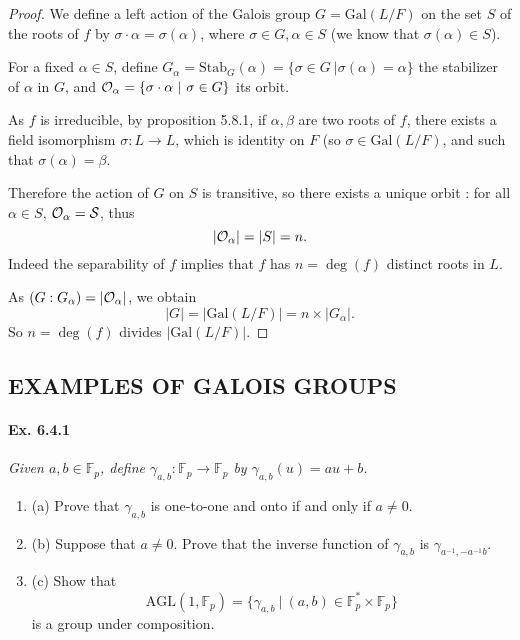 \documentclass[11pt,a4paper]{article}
\newcommand{\be} {\begin{enumerate}}
\newcommand{\ee} {\end{enumerate}}
\newcommand{\F}{\mathbb{F}}
\newcommand{\Gal}{\mathrm{Gal}}
\begin{document}
\begin{proof}

We define a left action of the Galois group $G = \Gal(L/F)$ on the set $S$ of the roots of $f$ by $\sigma \cdot \alpha = \sigma(\alpha)$, where $\sigma \in G,  \alpha \in S$ (we know that $\sigma(\alpha) \in S$).

For a fixed $\alpha \in  S$, define $G_{\alpha}= \mathrm{Stab}_G(\alpha) = \{\sigma \in G \ \vert \sigma(\alpha) = \alpha\}$ the stabilizer of $\alpha$ in $G$, and ${\cal O}_\alpha = \{\sigma \cdot \alpha \ \vert \  \sigma \in G \}$ its orbit.

As $f$ is irreducible, by proposition 5.8.1, if $\alpha,\beta$ are two roots of $f$, there exists a field isomorphism $\sigma : L \to L$, which is identity on $F$ (so $\sigma \in \Gal(L/F)$,  and such that $\sigma(\alpha) = \beta$.

Therefore the action of $G$ on $S$ is transitive, so there exists a unique orbit : for all $\alpha \in S$, $\cal{O}_\alpha = S$, thus
$$|{\cal O}_\alpha| = |S| = n.$$
Indeed the separability of $f$ implies that $f$ has $n = \deg(f)$ distinct roots in $L$.

As $(G : G_\alpha) = |{\cal O}_\alpha|$, we obtain
$$|G | = |\Gal(L/F) | = n \times |G_\alpha|.$$
So $n = \deg(f)$ divides $ |\Gal(L/F) | $.
\end{proof}

\subsection{EXAMPLES OF GALOIS GROUPS}
\paragraph{Ex. 6.4.1}

{\it Given $a,b\in \F_p$, define $\gamma_{a,b}:\F_p \to \F_p$ by $\gamma_{a,b}(u) = au +b$.
\be
\item[(a)] Prove that $\gamma_{a,b}$ is one-to-one and onto if and only if $a\neq 0$.
\item[(b)] Suppose that $a\ne 0$. Prove that the inverse function of $\gamma_{a,b}$ is $\gamma_{a^{-1},-a^{-1}b}$.
\item[(c)] Show that
$$\mathrm{AGL}(1,\F_p) = \{\gamma_{a,b}\ \vert \ (a,b) \in \F_p^* \times \F_p\}$$
is a group under composition.
\ee
}
\end{document}
